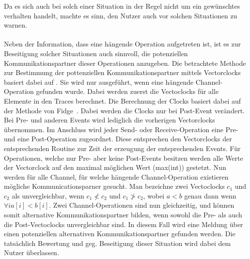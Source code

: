 Da es sich auch bei solch einer Situation in der Regel nicht um ein gewünschtes verhalten handelt, 
machte es sinn, den Nutzer auch vor solchen Situationen zu warnen.\\\\
Neben der Information, dass eine hängende Operation aufgetreten ist, ist es zur Beseitigung solcher 
Situationen auch sinnvoll, die potenziellen Kommunikationspartner dieser Operationen anzugeben. 
Die betrachtete Methode zur Bestimmung der pottenziellen Kommunikationspartner mittels Vectorclocks 
basiert dabei auf \cite{PPDP18}. Sie wird nur ausgeführt, wenn eine hängende Channel-Operation gefunden wurde.
Dabei werden zuerst die Vectoclocks für alle Elemente in den Traces 
berechnet. Die Berechnung der Clocks basiert dabei auf der Methode von Fidge~\cite{Fidge}. Dabei werden die
Clocks nur bei Post-Event verändert. Bei Pre- und anderen Events wird lediglich die vorherigen Vectorclocks
übernommen. Im Anschluss wird jeder Send- oder Receive-Operation eine Pre- und eine Post-Operation 
zugeordnet. Diese entsprechen den Vectorclocks der entsprechenden Routine zur Zeit der erzeugung 
der entsprechenden Events. Für Operationen, welche nur Pre- aber keine Post-Events besitzen 
werden alle Werte der Vectorclock auf den maximal möglichen Wert (max(int)) gestetzt. 
Nun werden für alle Channel, für welche hängende Channel-Operation existieren mögliche 
Kommunicationsparner gesucht. Man bezeichne zwei Vectoclocks $c_1$ und $c_2$ als unvergleichbar, wenn 
$c_1 \not < c_2$ und $c_1 \not > c_2$, wobei $a < b$ genau dann wenn $\forall i a[i] < b[i]$. 
Zwei Channel-Operationen sind nun gleichzeitig, und können somit alternative Kommunikationspartner
bilden, wenn sowohl die Pre- als auch die Post-Vectoclocks unvergleichbar sind. In diesem Fall 
wird eine Meldung über einen potenziellen alternativen Kommunikationspartner gefunden werden. 
Die tatsächlich Bewertung und geg. Beseitigung dieser Situation wird dabei dem Nutzer überlassen.
